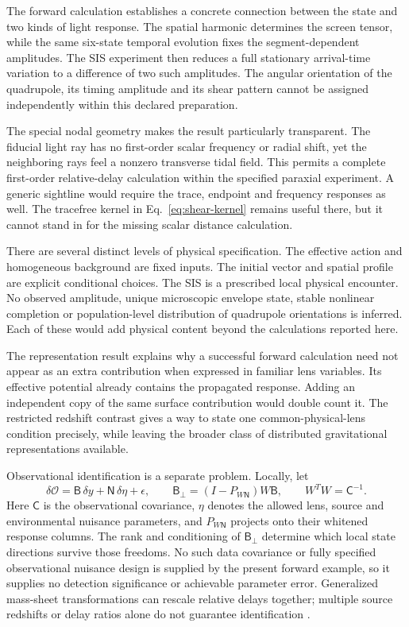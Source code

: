 \documentclass[11pt,a4paper]{article}
\begin{document}
The forward calculation establishes a concrete connection between the
state and two kinds of light response. The spatial harmonic determines
the screen tensor, while the same six-state temporal evolution fixes
the segment-dependent amplitudes. The SIS experiment then reduces a
full stationary arrival-time variation to a difference of two such
amplitudes. The angular orientation of the quadrupole, its timing
amplitude and its shear pattern cannot be assigned independently within this declared
preparation.

The special nodal geometry makes the result particularly transparent.
The fiducial light ray has no first-order scalar frequency or radial
shift, yet the neighboring rays feel a nonzero transverse tidal field.
This permits a complete first-order relative-delay calculation within
the specified paraxial experiment. A generic sightline would require
the trace, endpoint and frequency responses as well. The tracefree
kernel in Eq.~\eqref{eq:shear-kernel} remains useful there, but it cannot
stand in for the missing scalar distance calculation.

There are several distinct levels of physical specification. The
effective action and homogeneous background are fixed inputs. The
initial vector and spatial profile are explicit conditional choices.
The SIS is a prescribed local physical encounter. No observed amplitude,
unique microscopic envelope state, stable nonlinear completion or
population-level distribution of quadrupole orientations is inferred.
Each of these would add physical content beyond the calculations
reported here.

The representation result explains why a successful forward calculation
need not appear as an extra contribution when expressed in familiar
lens variables. Its effective potential already contains the propagated
response. Adding an independent copy of the same surface contribution
would double count it. The restricted redshift contrast gives a way to
state one common-physical-lens condition precisely, while leaving the
broader class of distributed gravitational representations available.

Observational identification is a separate problem. Locally, let
\begin{equation}
 \delta\mathcal O=\mathsf B\,\delta y+
 \mathsf N\,\delta\eta+\epsilon,
 \qquad
 \mathsf B_\perp=(I-P_{W\mathsf N})W\mathsf B,
 \qquad W^TW=\mathsf C^{-1}.
 \label{eq:identifiability}
\end{equation}
Here $\mathsf C$ is the observational covariance, $\eta$ denotes the
allowed lens, source and environmental nuisance parameters, and
$P_{W\mathsf N}$ projects onto their whitened response columns. The rank
and conditioning of $\mathsf B_\perp$ determine which local state
directions survive those freedoms. No such data covariance or fully
specified observational nuisance design is supplied by the present
forward example, so it supplies no detection significance or achievable
parameter error. Generalized mass-sheet transformations can rescale
relative delays together; multiple source redshifts or delay ratios
alone do not guarantee identification \cite{Schneider2019Multiplane}.
\end{document}
